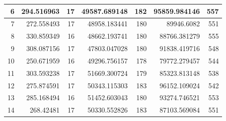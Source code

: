 \begin{table}
\begin{adjustwidth}{}{}
{{\begin{tabular}{|r|r|r|r|r|r|r|}
	\hline
	6                                          & 294.516963                   & 17                                    & 49587.689148                   & 182                                   & 95859.984146                 & 557                                    \\ 
	\hline
	7                                          & 272.558493                   & 17                                    & 48958.183441                   & 180                                   & 89946.6082                   & 551                                    \\ 
	\hline
	8                                          & 330.859349                   & 16                                    & 48662.193741                   & 180                                   & 88766.381279                 & 555                                    \\ 
	\hline
	9                                          & 308.087156                   & 17                                    & 47803.047028                   & 180                                   & 91838.419716                 & 548                                    \\ 
	\hline
	10                                         & 250.671959                   & 16                                    & 49296.756157                   & 178                                   & 79772.279457                 & 544                                    \\ 
	\hline
	11                                         & 303.593238                   & 17                                    & 51669.300724                   & 179                                   & 85323.813148                 & 538                                    \\ 
	\hline
	12                                         & 275.874591                   & 17                                    & 50343.115303                   & 183                                   & 96152.109024                 & 542                                    \\ 
	\hline
	13                                         & 285.168494                   & 16                                    & 51452.603043                   & 180                                   & 93274.746521                 & 553                                    \\ 
	\hline
	14                                         & 268.42481                    & 17                                    & 50330.552826                   & 183                                   & 87103.569084                 & 551                                    \\ 

\end{tabular}}}
\end{adjustwidth}
\end{table}
